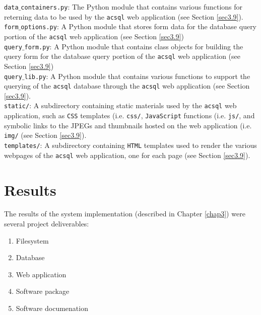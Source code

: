 \documentclass[10pt,journal,compsoc]{IEEEtran}
\begin{document}
\noindent\texttt{data$\_$containers.py}: The Python module that contains various functions for reterning data to be used by the \texttt{acsql} web application (see Section \ref{sec3.9}).\\

\noindent\texttt{form$\_$options.py}: A Python module that stores form data for the database query portion of the \texttt{acsql} web application (see Section \ref{sec3.9})\\

\noindent\texttt{query$\_$form.py}: A Python module that contains class objects for building the query form for the database query portion of the \texttt{acsql} web application (see Section \ref{sec3.9})\\

\noindent\texttt{query$\_$lib.py}: A Python module that contains various functions to support the querying of the \texttt{acsql} database through the \texttt{acsql} web application (see Section \ref{sec3.9}).\\

\noindent\texttt{static/}: A subdirectory containing static materials used by the \texttt{acsql} web application, such as \texttt{CSS} templates (i.e. \texttt{css/}, \texttt{JavaScript} functions
(i.e. \texttt{js/}, and symbolic links to the JPEGs and thumbnails hosted on the web application (i.e. \texttt{img/} (see Section \ref{sec3.9}).\\

\noindent\texttt{templates/}: A subdirectory containing \texttt{HTML} templates used to render the various webpages of the \texttt{acsql} web application, one for each page (see Section \ref{sec3.9}).\\


\section{Results} \label{chap4}

The results of the system implementation (described in Chapter \ref{chap3}) were several project deliverables:

\begin{enumerate}
\item Filesystem
\item Database
\item Web application
\item Software package
\item Software documenation
\end{enumerate}
\end{document}
